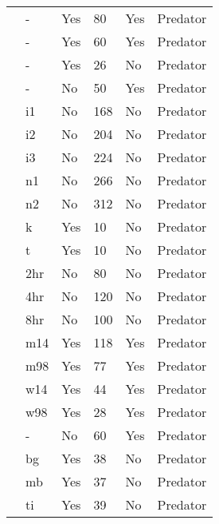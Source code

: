 \begin{longtable}{llllll}
\citet{Prokopenko:2017aa}&-&Yes&80&Yes&Predator\tabularnewline
\citet{Pusack:2018aa}&-&Yes&60&Yes&Predator\tabularnewline
\citet{Reeve:1997aa}&-&Yes&26&No&Predator\tabularnewline
\citet{Salt:1974aa}&-&No&50&Yes&Predator\tabularnewline
\citet{Uttley:1980aa}&i1&No&168&No&Predator\tabularnewline
\citet{Uttley:1980aa}&i2&No&204&No&Predator\tabularnewline
\citet{Uttley:1980aa}&i3&No&224&No&Predator\tabularnewline
\citet{Uttley:1980aa}&n1&No&266&No&Predator\tabularnewline
\citet{Uttley:1980aa}&n2&No&312&No&Predator\tabularnewline
\citet{Vahl:2005aa}&k&Yes&10&No&Predator\tabularnewline
\citet{Vahl:2005aa}&t&Yes&10&No&Predator\tabularnewline
\citet{Von-Westernhagen:1976aa}&2hr&No&80&No&Predator\tabularnewline
\citet{Von-Westernhagen:1976aa}&4hr&No&120&No&Predator\tabularnewline
\citet{Von-Westernhagen:1976aa}&8hr&No&100&No&Predator\tabularnewline
\citet{Vucetich:2002aa}&m14&Yes&118&Yes&Predator\tabularnewline
\citet{Vucetich:2002aa}&m98&Yes&77&Yes&Predator\tabularnewline
\citet{Vucetich:2002aa}&w14&Yes&44&Yes&Predator\tabularnewline
\citet{Vucetich:2002aa}&w98&Yes&28&Yes&Predator\tabularnewline
\citet{Walde:1984aa}&-&No&60&Yes&Predator\tabularnewline
\citet{Wasserman:2016aa}&bg&Yes&38&No&Predator\tabularnewline
\citet{Wasserman:2016aa}&mb&Yes&37&No&Predator\tabularnewline
\citet{Wasserman:2016aa}&ti&Yes&39&No&Predator\tabularnewline
\hline
\end{longtable}

